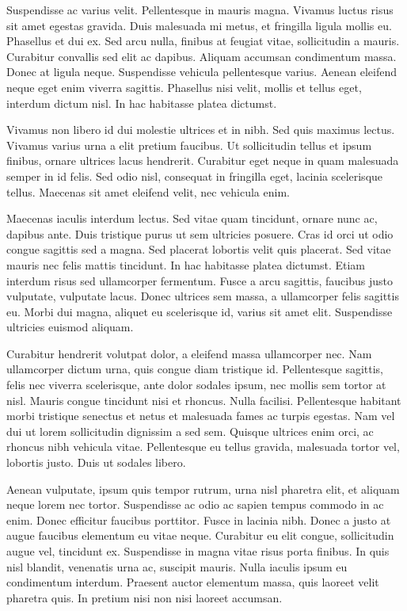 \documentclass[a4paper,twoside,notitlepage,openright,11pt]{report}
\begin{document}
Suspendisse ac varius velit. Pellentesque in mauris magna. Vivamus luctus risus sit amet egestas gravida. Duis malesuada mi metus, et fringilla ligula mollis eu. Phasellus et dui ex. Sed arcu nulla, finibus at feugiat vitae, sollicitudin a mauris. Curabitur convallis sed elit ac dapibus. Aliquam accumsan condimentum massa. Donec at ligula neque. Suspendisse vehicula pellentesque varius. Aenean eleifend neque eget enim viverra sagittis. Phasellus nisi velit, mollis et tellus eget, interdum dictum nisl. In hac habitasse platea dictumst.

Vivamus non libero id dui molestie ultrices et in nibh. Sed quis maximus lectus. Vivamus varius urna a elit pretium faucibus. Ut sollicitudin tellus et ipsum finibus, ornare ultrices lacus hendrerit. Curabitur eget neque in quam malesuada semper in id felis. Sed odio nisl, consequat in fringilla eget, lacinia scelerisque tellus. Maecenas sit amet eleifend velit, nec vehicula enim.

Maecenas iaculis interdum lectus. Sed vitae quam tincidunt, ornare nunc ac, dapibus ante. Duis tristique purus ut sem ultricies posuere. Cras id orci ut odio congue sagittis sed a magna. Sed placerat lobortis velit quis placerat. Sed vitae mauris nec felis mattis tincidunt. In hac habitasse platea dictumst. Etiam interdum risus sed ullamcorper fermentum. Fusce a arcu sagittis, faucibus justo vulputate, vulputate lacus. Donec ultrices sem massa, a ullamcorper felis sagittis eu. Morbi dui magna, aliquet eu scelerisque id, varius sit amet elit. Suspendisse ultricies euismod aliquam.

Curabitur hendrerit volutpat dolor, a eleifend massa ullamcorper nec. Nam ullamcorper dictum urna, quis congue diam tristique id. Pellentesque sagittis, felis nec viverra scelerisque, ante dolor sodales ipsum, nec mollis sem tortor at nisl. Mauris congue tincidunt nisi et rhoncus. Nulla facilisi. Pellentesque habitant morbi tristique senectus et netus et malesuada fames ac turpis egestas. Nam vel dui ut lorem sollicitudin dignissim a sed sem. Quisque ultrices enim orci, ac rhoncus nibh vehicula vitae. Pellentesque eu tellus gravida, malesuada tortor vel, lobortis justo. Duis ut sodales libero.

Aenean vulputate, ipsum quis tempor rutrum, urna nisl pharetra elit, et aliquam neque lorem nec tortor. Suspendisse ac odio ac sapien tempus commodo in ac enim. Donec efficitur faucibus porttitor. Fusce in lacinia nibh. Donec a justo at augue faucibus elementum eu vitae neque. Curabitur eu elit congue, sollicitudin augue vel, tincidunt ex. Suspendisse in magna vitae risus porta finibus. In quis nisl blandit, venenatis urna ac, suscipit mauris. Nulla iaculis ipsum eu condimentum interdum. Praesent auctor elementum massa, quis laoreet velit pharetra quis. In pretium nisi non nisi laoreet accumsan.
\end{document}
